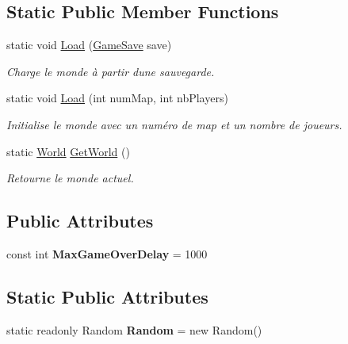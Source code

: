 \subsection*{Static Public Member Functions}
\begin{DoxyCompactItemize}
\item 
static void \hyperlink{class_tentacle_slicers_1_1maps_1_1_world_a04ef69bcd3d1eb1e0aed79a61a481bf4}{Load} (\hyperlink{class_tentacle_slicers_1_1maps_1_1_game_save}{Game\+Save} save)
\begin{DoxyCompactList}\small\item\em Charge le monde à partir d\textquotesingle{}une sauvegarde. \end{DoxyCompactList}\item 
static void \hyperlink{class_tentacle_slicers_1_1maps_1_1_world_acf0958d5895361adbbeada432516abff}{Load} (int num\+Map, int nb\+Players)
\begin{DoxyCompactList}\small\item\em Initialise le monde avec un numéro de map et un nombre de joueurs. \end{DoxyCompactList}\item 
static \hyperlink{class_tentacle_slicers_1_1maps_1_1_world}{World} \hyperlink{class_tentacle_slicers_1_1maps_1_1_world_afc92ddf0168726d7651893a2e0f5bc39}{Get\+World} ()
\begin{DoxyCompactList}\small\item\em Retourne le monde actuel. \end{DoxyCompactList}\end{DoxyCompactItemize}
\subsection*{Public Attributes}
\begin{DoxyCompactItemize}
\item 
\mbox{\label{class_tentacle_slicers_1_1maps_1_1_world_a9f1a1f19b560d569796ff2aef5049933}} 
const int {\bfseries Max\+Game\+Over\+Delay} = 1000
\end{DoxyCompactItemize}
\subsection*{Static Public Attributes}
\begin{DoxyCompactItemize}
\item 
\mbox{\label{class_tentacle_slicers_1_1maps_1_1_world_a90f631ad305f23a37fb9ede4bd9ac759}} 
static readonly Random {\bfseries Random} = new Random()
\end{DoxyCompactItemize}
